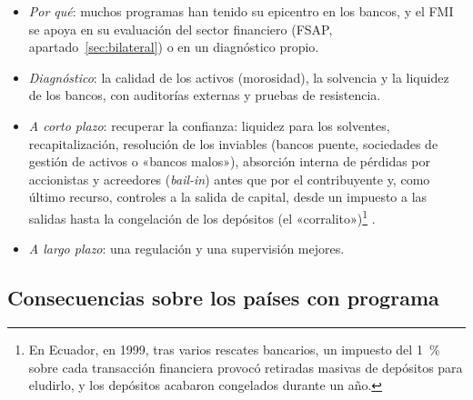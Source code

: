\documentclass[11pt]{article}
\begin{document}
\begin{itemize}
\item \emph{Por qué}: muchos programas han tenido su epicentro en los bancos, y el FMI se apoya en su evaluación del sector financiero (FSAP, apartado~\ref{sec:bilateral}) o en un diagnóstico propio.
\item \emph{Diagnóstico}: la calidad de los activos (morosidad), la solvencia y la liquidez de los bancos, con auditorías externas y pruebas de resistencia.
\item \emph{A corto plazo}: recuperar la confianza: liquidez para los solventes, recapitalización, resolución de los inviables (bancos puente, sociedades de gestión de activos o «bancos malos»), absorción interna de pérdidas por accionistas y acreedores (\emph{bail-in}) antes que por el contribuyente y, como último recurso, controles a la salida de capital, desde un impuesto a las salidas hasta la congelación de los depósitos (el «corralito»)\footnote{En Ecuador, en 1999, tras varios rescates bancarios, un impuesto del 1~\% sobre cada transacción financiera provocó retiradas masivas de depósitos para eludirlo, y los depósitos acabaron congelados durante un año.} .
\item \emph{A largo plazo}: una regulación y una supervisión mejores.
\end{itemize}

\subsection{Consecuencias sobre los países con programa}\label{sec:consecuencias}
\end{document}
